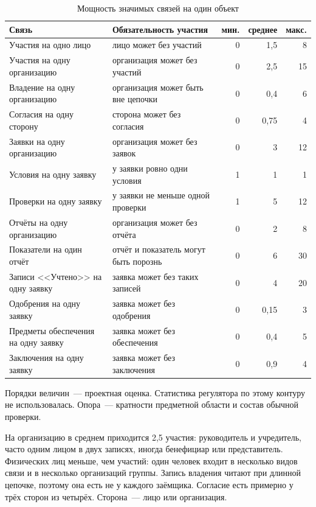 \begin{table}[H]
\centering
\caption{Мощность значимых связей на один объект}
\label{tab:power-links}
\small
\setlength{\tabcolsep}{3pt}
\begin{tabular}{|>{\raggedright\arraybackslash}p{}|>{\raggedright\arraybackslash}p{}|r|r|r|}
\hline
\textbf{Связь} & \textbf{Обязательность участия} & \textbf{мин.} & \textbf{среднее} & \textbf{макс.} \\
\hline
Участия на одно лицо & лицо может без участий & 0 & 1,5 & 8 \\
\hline
Участия на одну организацию & организация может без участий & 0 & 2,5 & 15 \\
\hline
Владение на одну организацию & организация может быть вне цепочки & 0 & 0,4 & 6 \\
\hline
Согласия на одну сторону & сторона может без согласия & 0 & 0,75 & 4 \\
\hline
Заявки на одну организацию & организация может без заявок & 0 & 3 & 12 \\
\hline
Условия на одну заявку & у заявки ровно одни условия & 1 & 1 & 1 \\
\hline
Проверки на одну заявку & у заявки не меньше одной проверки & 1 & 5 & 12 \\
\hline
Отчёты на одну организацию & организация может без отчёта & 0 & 2 & 8 \\
\hline
Показатели на один отчёт & отчёт и показатель могут быть порознь & 0 & 6 & 30 \\
\hline
Записи <<Учтено>> на одну заявку & заявка может без таких записей & 0 & 4 & 20 \\
\hline
Одобрения на одну заявку & заявка может без одобрения & 0 & 0,15 & 3 \\
\hline
Предметы обеспечения на одну заявку & заявка может без обеспечения & 0 & 0,4 & 5 \\
\hline
Заключения на одну заявку & заявка может без заключения & 0 & 0,9 & 4 \\
\hline
\end{tabular}
\end{table}
\par
Порядки величин~--- проектная оценка. Статистика регулятора по этому контуру не использовалась. Опора~--- кратности предметной области и состав обычной проверки.
\par
На организацию в среднем приходится 2,5 участия: руководитель и учредитель, часто одним лицом в двух записях, иногда бенефициар или представитель. Физических лиц меньше, чем участий: один человек входит в несколько видов связи и в несколько организаций группы. Запись владения читают при длинной цепочке, поэтому она есть не у каждого заёмщика. Согласие есть примерно у трёх сторон из четырёх. Сторона~--- лицо или организация.
